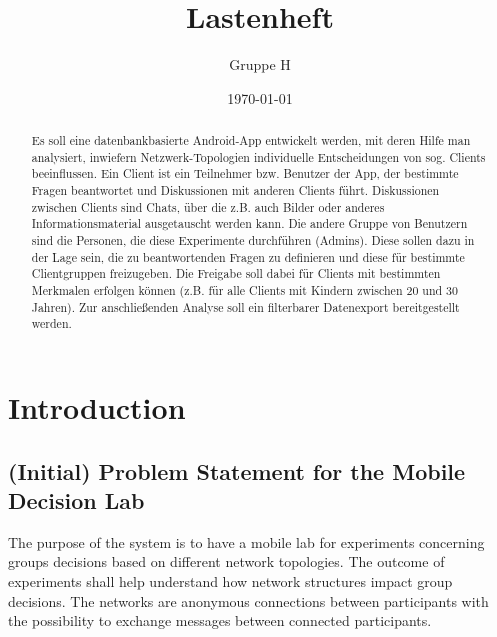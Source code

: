 \documentclass[a4paper, 10pt]{scrreprt}
\title{Lastenheft}
\author{Gruppe H}
\date{\today}
\begin{document}
\maketitle


\tableofcontents


\begin{abstract}
 
Es soll eine datenbankbasierte Android-App entwickelt werden, 
mit deren Hilfe man analysiert, inwiefern Netzwerk-Topologien individuelle Entscheidungen von sog. Clients beeinflussen. 
Ein Client ist ein Teilnehmer bzw. Benutzer der App, der bestimmte Fragen beantwortet und Diskussionen mit anderen Clients führt. 
Diskussionen zwischen Clients sind Chats, über die z.B. auch Bilder oder anderes Informationsmaterial ausgetauscht werden kann. 
Die andere Gruppe von Benutzern sind die Personen, die diese Experimente durchführen (Admins). 
Diese sollen dazu in der Lage sein, die zu beantwortenden Fragen zu definieren und diese für bestimmte Clientgruppen freizugeben. 
Die Freigabe soll dabei für Clients mit bestimmten Merkmalen erfolgen können (z.B. für alle Clients mit Kindern zwischen 20 und 30 Jahren). 
Zur anschließenden Analyse soll ein filterbarer Datenexport bereitgestellt werden.

\end{abstract}







\chapter{Introduction}

\section{(Initial) Problem Statement for the Mobile Decision Lab}
The purpose of the system is to have a mobile lab for experiments concerning groups decisions based on different network topologies. The outcome of experiments shall help understand how network structures impact group decisions. The networks are anonymous connections between participants with the possibility to exchange messages between connected participants.
\end{document}
